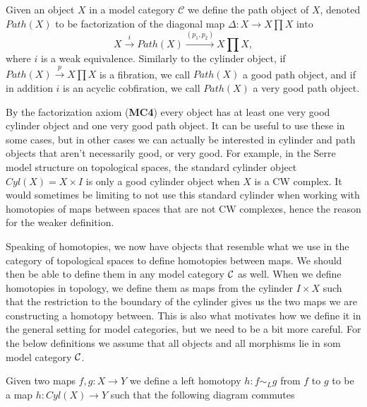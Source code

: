 \begin{definition}
Given an object $X$ in a model category $\mathcal{C}$ we define the path object of $X$, denoted $Path(X)$ to be factorization of the diagonal map $\Delta\colon X \rightarrow X\prod X$ into
\begin{equation*}
     X \overset{i}\rightarrow Path(X) \overset{(p_1,p_2)}\rightarrow X \prod X,
\end{equation*}
where $i$ is a weak equivalence. Similarly to the cylinder object, if $Path(X)\overset{p}\rightarrow X\prod X$ is a fibration, we call $Path(X)$ a good path object, and if in addition $i$ is an acyclic cobfiration, we call $Path(X)$ a very good path object.
\end{definition}

By the factorization axiom (\textbf{MC4}) every object has at least one very good cylinder object and one very good path object. It can be useful to use these in some cases, but in other cases we can actually be interested in cylinder and path objects that aren't necessarily good, or very good. For example, in the Serre model structure on topological spaces, the standard cylinder object $Cyl(X)=X\times I$ is only a good cylinder object when $X$ is a CW complex. It would sometimes be limiting to not use this standard cylinder when working with homotopies of maps between spaces that are not CW complexes, hence the reason for the weaker definition. 

Speaking of homotopies, we now have objects that resemble what we use in the category of topological spaces to define homotopies between maps. We should then be able to define them in any model category $\mathcal{C}$ as well. When we define homotopies in topology, we define them as maps from the cylinder $I\times X$ such that the restriction to the boundary of the cylinder gives us the two maps we are constructing a homotopy between. This is also what motivates how we define it in the general setting for model categories, but we need to be a bit more careful. For the below definitions we assume that all objects and all morphisms lie in som model category $\mathcal{C}$.

\begin{definition}
Given two maps $f,g: X\rightarrow Y$ we define a left homotopy $h:f\sim_L g$ from $f$ to $g$ to be a map $h: Cyl(X)\rightarrow Y$ such that the following diagram commutes
\begin{center}
\end{center}
\end{definition}

